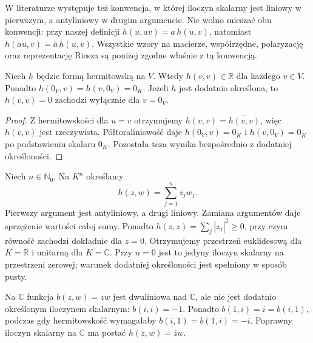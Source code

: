 \begin{uwaga}
\label{rem:lin12-konwencja}
W literaturze występuje też konwencja, w której
iloczyn skalarny jest liniowy w pierwszym,
a antyliniowy w drugim argumencie.
Nie wolno mieszać obu konwencji:
przy naszej definicji
\(h(u,av)=a\,h(u,v)\),
natomiast \(h(au,v)=\overline a\,h(u,v)\).
Wszystkie wzory na macierze, współrzędne,
polaryzację oraz reprezentację Riesza
są poniżej zgodne właśnie z tą konwencją.
\end{uwaga}

\begin{stwierdzenie}
\label{prop:lin12-przekatna}
Niech \(h\) będzie formą hermitowską na \(V\).
Wtedy \(h(v,v)\in\mathbb R\) dla każdego \(v\in V\).
Ponadto \(h(0_V,v)=h(v,0_V)=0_K\).
Jeżeli \(h\) jest dodatnio określona, to
\(h(v,v)=0\) zachodzi wyłącznie dla \(v=0_V\).
\end{stwierdzenie}
\begin{proof}
Z hermitowskości dla \(u=v\) otrzymujemy
\(h(v,v)=\overline{h(v,v)}\), więc
\(h(v,v)\) jest rzeczywista.
Półtoraliniowość daje
\(h(0_V,v)=0_K\) i \(h(v,0_V)=0_K\)
po podstawieniu skalaru \(0_K\).
Pozostała teza wynika bezpośrednio
z dodatniej określoności.
\end{proof}

\begin{przyklad}
\label{prz:lin12-standardowy}
Niech \(n\in\mathbb N_0\).
Na \(K^n\) określamy
\[
 h(z,w)=\sum_{j=1}^{n}\overline{z_j}w_j.
\]
Pierwszy argument jest antyliniowy,
a drugi liniowy. Zamiana argumentów
daje sprzężenie wartości całej sumy.
Ponadto
\(h(z,z)=\sum_j|z_j|^2\ge0\),
przy czym równość zachodzi dokładnie dla \(z=0\).
Otrzymujemy przestrzeń euklidesową
dla \(K=\mathbb R\) i unitarną
dla \(K=\mathbb C\).
Przy \(n=0\) jest to jedyny iloczyn
skalarny na przestrzeni zerowej;
warunek dodatniej określoności jest
spełniony w sposób pusty.
\end{przyklad}

\begin{przyklad}
\label{prz:lin12-nie-dwuliniowa}
Na \(\mathbb C\) funkcja \(b(z,w)=zw\)
jest dwuliniowa nad \(\mathbb C\),
ale nie jest dodatnio określonym
iloczynem skalarnym:
\(b(i,i)=-1\).
Ponadto \(b(1,i)=i=b(i,1)\),
podczas gdy hermitowskość wymagałaby
\(b(i,1)=\overline{b(1,i)}=-i\).
Poprawny iloczyn skalarny na \(\mathbb C\)
ma postać \(h(z,w)=\overline zw\).
\end{przyklad}

